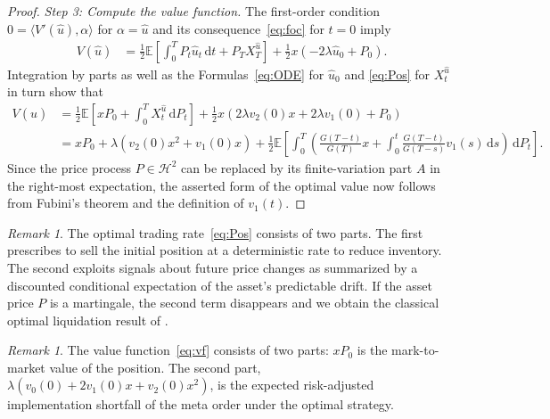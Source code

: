 \documentclass[11pt]{article}
\numberwithin{equation}{section}
\theoremstyle{definition}
\theoremstyle{remark}
\newtheorem{rem}[thm]{Remark}
\newcommand{\E}{\mathbb{E}} %
\newcommand{\de}{\,\mathrm{d}}
\begin{document}
\begin{proof}
\emph{Step 3: Compute the value function.}
The first-order condition $0=\langle V'(\hat{u}), \alpha \rangle$ for $\alpha=\hat{u}$ and its consequence~\eqref{eq:foc} for $t=0$ imply
\begin{align*}
V(\hat{u}) &= \frac{1}{2}\E\left[\int_0^T P_t \hat{u}_t \de t + P_T X^{\hat{u}}_T \right] + \frac{1}{2}x(-2\lambda \hat{u}_0 + P_0).
\end{align*}
Integration by parts as well as the Formulas~\eqref{eq:ODE} for $\hat{u}_0$ and \eqref{eq:Pos} for $X^{\hat{u}}_t$ in turn show that
\begin{align*}
V(\hat{u}) &=\frac{1}{2}\E\left[xP_0 + \int_0^T X^{\hat{u}}_t \de P_t \right] + \frac{1}{2}x(2\lambda v_2(0)x + 2\lambda v_1(0) + P_0)\\
&= xP_0 + \lambda(v_2(0)x^2+v_1(0)x) + \frac{1}{2}\E\left[\int_0^T \left(\frac{G(T-t)}{G(T)}x + \int_0^t \frac{G(T-t)}{G(T-s)}v_1(s) \de s\right) \de P_t\right].
\end{align*}
Since the price process $P \in \mathcal{H}^2$ can be replaced by its finite-variation part $A$ in the right-most expectation, the asserted form of the optimal value now follows from Fubini's theorem and the definition of $v_1(t)$. 
\end{proof}


\begin{rem}
The optimal trading rate~\eqref{eq:Pos} consists of two parts. The first prescribes to sell the initial position at a deterministic rate to reduce inventory. The second exploits signals about future price changes as summarized by a discounted conditional expectation of the asset's predictable drift. If the asset price $P$ is a martingale, the second term disappears and we obtain the classical optimal liquidation result of \cite{almgren2001optimal}. 
\end{rem}

\begin{rem}
The value function~\eqref{eq:vf} consists of two parts: $xP_0$ is the mark-to-market value of the position. The second part, $\lambda(v_0(0)+2v_1(0)x+v_2(0)x^2)$, is the expected risk-adjusted implementation shortfall of the meta order under the optimal strategy.
\end{rem}
\end{document}
